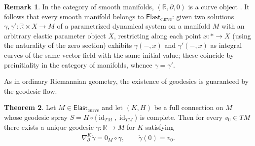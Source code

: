 \documentclass{amsart}
\newcommand{\R}{\mathbb{R}}
\DeclareMathOperator{\id}{id}
\theoremstyle{definition}
\newtheorem{thm}{Theorem}[section]
\newtheorem{rem}[thm]{Remark}
\begin{document}
\begin{rem}\label{rem:manifolds-curve}
  In the category of smooth manifolds, $(\R, \partial, 0)$ is a curve object \cite[Example~4.2]{CCL}. 
  It follows that every smooth manifold belongs to $\mathsf{Elast}_{\mathrm{curve}}$: given two solutions $\gamma, \gamma' \colon \R \times X \to M$ of a parametrized dynamical system on a manifold $M$ with an arbitrary elastic parameter object $X$, restricting along each point $x \colon * \to X$ (using the naturality of the zero section) exhibits $\gamma(-, x)$ and
  $\gamma'(-, x)$ as integral curves of the same vector field with the same initial value; these coincide by preinitiality in the category of manifolds, whence $\gamma = \gamma'$.
\end{rem}

As in ordinary Riemannian geometry,
the existence of geodesics is guaranteed by the geodesic flow.

\begin{thm}\label{thm:geodesic-existence}
  Let $M \in \mathsf{Elast}_{\mathrm{curve}}$ and let $(K, H)$ be a full connection
  on $M$ whose geodesic spray
  $S = H \circ \langle \id_{TM}, \id_{TM} \rangle$ is complete.
  Then for every $v_0 \in TM$ there exists a unique
  geodesic $\gamma \colon \R \to M$ for $K$ satisfying
  \begin{align*}
      \nabla^K_{\partial} \dot{\gamma} = 0_{M} \circ \gamma,
      \qquad
      \dot{\gamma}(0) = v_0.
  \end{align*}
\end{thm}
\end{document}
